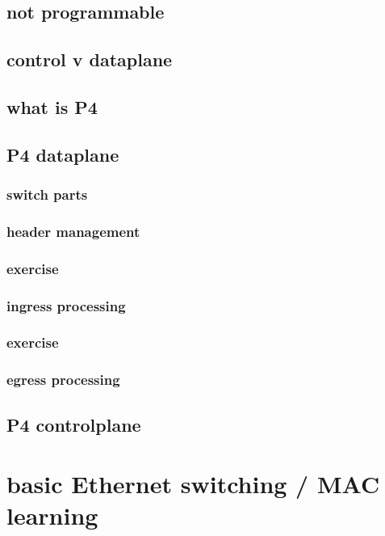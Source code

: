 \subsection{not programmable}


\subsection{control v dataplane}


\subsection{what is P4}

\subsection{P4 dataplane}
\subsubsection{switch parts}

\subsubsection{header management}

\subsubsection{exercise}

\subsubsection{ingress processing}

\subsubsection{exercise}

\subsubsection{egress processing}


\subsection{P4 controlplane}


\section{basic Ethernet switching / MAC learning}

